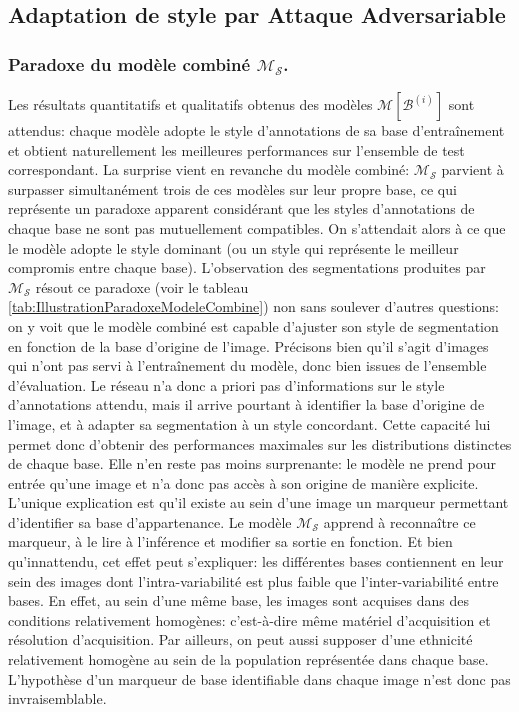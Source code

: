\subsection{Adaptation de style par Attaque Adversariable}

\subsubsection{Paradoxe du modèle combiné $\mathcal{M}_{\mathcal{S}}$.}


Les résultats quantitatifs et qualitatifs obtenus des modèles $\mathcal{M}[\mathcal{B}^{(i)}]$ sont attendus: chaque modèle adopte le style d'annotations de sa base d'entraînement et obtient naturellement les meilleures performances sur l'ensemble de test correspondant. La surprise vient en revanche du modèle combiné:  $\mathcal{M}_{\mathcal{S}}$ parvient à surpasser simultanément trois de ces modèles sur leur propre base, ce qui représente un paradoxe apparent considérant que les styles d'annotations de chaque base ne sont pas mutuellement compatibles. On s'attendait alors à ce que le modèle adopte le style dominant (ou un style qui représente le meilleur compromis entre chaque base). L'observation des segmentations produites par $\mathcal{M}_{\mathcal{S}}$ résout ce paradoxe (voir le tableau \ref{tab:IllustrationParadoxeModeleCombine}) non sans soulever d'autres questions: on y voit que le modèle combiné est capable d'ajuster son style de segmentation en fonction de la base d'origine de l'image. Précisons bien qu'il s'agit d'images qui n'ont pas servi à l'entraînement du modèle, donc bien issues de l'ensemble d'évaluation. Le réseau n'a donc a priori pas d'informations sur le style d'annotations attendu, mais il arrive pourtant à identifier la base d'origine de l'image, et à adapter sa segmentation à un style concordant. Cette capacité lui permet donc d'obtenir des performances maximales sur les distributions distinctes de chaque base. Elle n'en reste pas moins surprenante: le modèle ne prend pour entrée qu'une image et n'a donc pas accès à son origine de manière explicite. L'unique explication est qu'il existe au sein d'une image un marqueur permettant d'identifier sa base d'appartenance. Le modèle $\mathcal{M}_{\mathcal{S}}$ apprend à reconnaître ce marqueur, à le lire à l'inférence et modifier sa sortie en fonction. Et bien qu'innattendu, cet effet peut s'expliquer: les différentes bases contiennent en leur sein des images dont l'intra-variabilité est plus faible que l'inter-variabilité entre bases. En effet,  au sein d'une même base, les images sont acquises dans des conditions relativement homogènes: c'est-à-dire même matériel d'acquisition et résolution d'acquisition. Par ailleurs, on peut aussi supposer d'une ethnicité relativement homogène au sein de la population représentée dans chaque base. L'hypothèse d'un marqueur de base identifiable dans chaque image n'est donc pas invraisemblable. 
